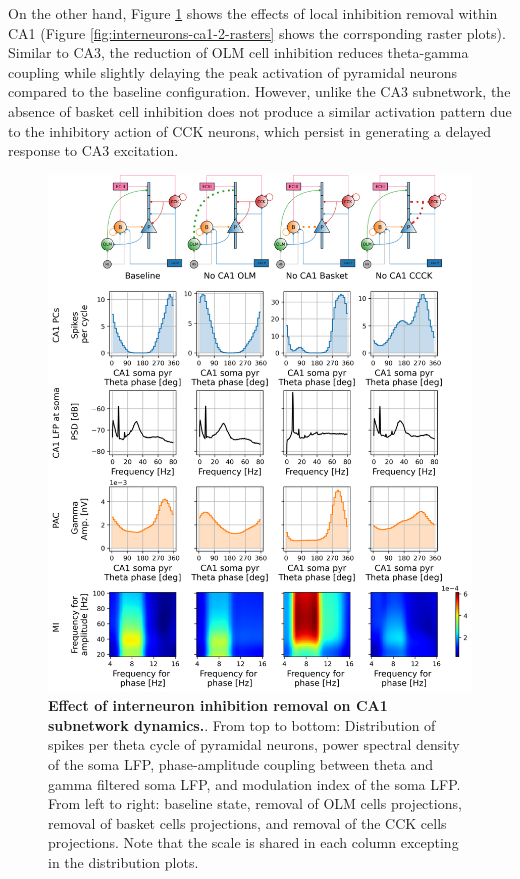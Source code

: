 \documentclass[../main.tex]{subfiles}
\begin{document}
On the other hand, Figure \ref{fig:no-inhibition-ca1-2} shows the effects of local inhibition removal within CA1 (Figure \ref{fig:interneurons-ca1-2-rasters} shows the corrsponding raster plots).
Similar to CA3, the reduction of OLM cell inhibition reduces theta-gamma coupling while slightly delaying the peak activation of pyramidal neurons compared to the baseline configuration.
However, unlike the CA3 subnetwork, the absence of basket cell inhibition does not produce a similar activation pattern due to the inhibitory action of CCK neurons, which persist in generating a delayed response to CA3 excitation.
\begin{figure}[htbp]
    \centering
    \includegraphics[width=\textwidth]{chapter4/figures/removing_interneurons/removing_interneurons_ca1_v2_lfp.png}
    \caption{\textbf{Effect of interneuron inhibition removal on CA1 subnetwork dynamics.}.
    From top to bottom: Distribution of spikes per theta cycle of pyramidal neurons, power spectral density  of the soma LFP, phase-amplitude coupling between theta and gamma filtered soma LFP, and modulation index of the soma LFP.
    From left to right: baseline state, removal of OLM cells projections, removal of basket cells projections, and removal of the CCK cells projections.
    Note that the scale is shared in each column excepting in the distribution plots.}
    \label{fig:no-inhibition-ca1-2}
\end{figure}
\end{document}
